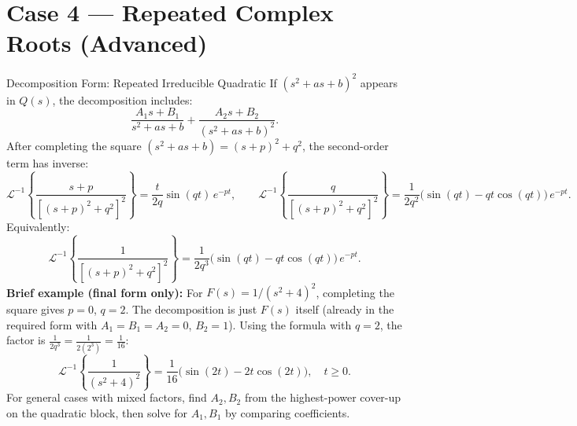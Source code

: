 \documentclass[12pt,a4paper]{article}
\begin{document}
\section{Case 4 --- Repeated Complex Roots (Advanced)}
\begin{infobox}{Decomposition Form: Repeated Irreducible Quadratic}
If $(s^2+as+b)^2$ appears in $Q(s)$, the decomposition includes:
\[
  \frac{A_1 s+B_1}{s^2+as+b} + \frac{A_2 s+B_2}{(s^2+as+b)^2}.
\]
After completing the square $(s^2+as+b)=(s+p)^2+q^2$, the second-order term
has inverse:
\[
  \mathcal{L}^{-1}\!\left\{\frac{s+p}{[(s+p)^2+q^2]^2}\right\}
  = \frac{t}{2q}\sin(qt)\,e^{-pt},\qquad
  \mathcal{L}^{-1}\!\left\{\frac{q}{[(s+p)^2+q^2]^2}\right\}
  = \frac{1}{2q^2}\bigl(\sin(qt)-qt\cos(qt)\bigr)\,e^{-pt}.
\]
Equivalently:
\[
  \mathcal{L}^{-1}\!\left\{\frac{1}{[(s+p)^2+q^2]^2}\right\}
  = \frac{1}{2q^3}\bigl(\sin(qt)-qt\cos(qt)\bigr)\,e^{-pt}.
\]
\textbf{Brief example (final form only):}
For $F(s) = 1/(s^2+4)^2$, completing the square gives $p=0$, $q=2$.
The decomposition is just $F(s)$ itself (already in the required form with
$A_1=B_1=A_2=0$, $B_2=1$). Using the formula with $q=2$, the factor is $\frac{1}{2q^3} = \frac{1}{2(2^3)} = \frac{1}{16}$:
\[
  \mathcal{L}^{-1}\!\left\{\frac{1}{(s^2+4)^2}\right\}
  = \frac{1}{16}\bigl(\sin(2t)-2t\cos(2t)\bigr), \quad t\geq 0.
\]
For general cases with mixed factors, find $A_2,B_2$ from the highest-power
cover-up on the quadratic block, then solve for $A_1,B_1$ by comparing
coefficients.
\end{infobox}

\end{document}
